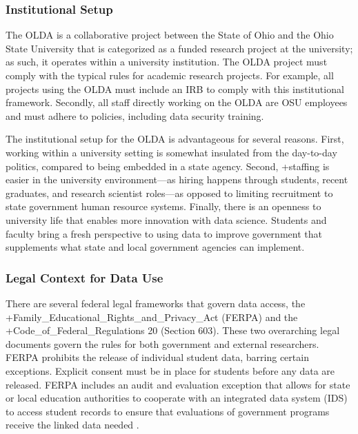 \documentclass[
]{WileySix}
\begin{document}
\hypertarget{institutional-setup-1}{%
\subsubsection{Institutional Setup}\label{institutional-setup-1}}

The OLDA is a collaborative project between the State of Ohio and the Ohio State University that is categorized as a funded research project at the university; as such, it operates within a university institution. The OLDA project must comply with the typical rules for academic research projects. For example, all projects using the OLDA must include an IRB to comply with this institutional framework. Secondly, all staff directly working on the OLDA are OSU employees and must adhere to policies, including data security training.

The institutional setup for the OLDA is advantageous for several reasons. First, working within a university setting is somewhat insulated from the day-to-day politics, compared to being embedded in a state agency. Second, +staffing\textbar{} is easier in the university environment---as hiring happens through students, recent graduates, and research scientist roles---as opposed to limiting recruitment to state government human resource systems. Finally, there is an openness to university life that enables more innovation with data science. Students and faculty bring a fresh perspective to using data to improve government that supplements what state and local government agencies can implement.

\hypertarget{legal-context-for-data-use-1}{%
\subsubsection{Legal Context for Data Use}\label{legal-context-for-data-use-1}}

There are several federal legal frameworks that govern data access, the +Family\_Educational\_Rights\_and\_Privacy\_Act\textbar{} (FERPA) and the +Code\_of\_Federal\_Regulations\textbar{} 20 (Section 603). These two overarching legal documents govern the rules for both government and external researchers. FERPA prohibits the release of individual student data, barring certain exceptions. Explicit consent must be in place for students before any data are released. FERPA includes an audit and evaluation exception that allows for state or local education authorities to cooperate with an integrated data system (IDS) to access student records to ensure that evaluations of government programs receive the linked data needed \citep{privacytechnicalassistancecenter2017}.
\end{document}

